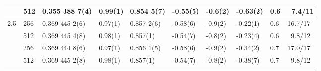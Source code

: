 \documentclass[11pt]{article}
\begin{document}
\begin{table}[htbp]
{\begin{tabular}{l|lllllllll}
        ~ & 512 & 0.355 388 7(4) & 0.99(1) & 0.854 5(7) & -0.55(5) & -0.6(2) &	-0.63(2)  & 0.6 & ~7.4/11 \\ \hline
        2.5 & 256 & 0.369 445 2(6) & 0.97(1) & 0.857 2(6) & -0.58(6) &	-0.9(2) &-0.22(1)  & 0.6 & 16.7/17  \\ 
        ~ & 512 & 0.369 445 4(8) & 0.98(1) &	0.857(1) &	-0.54(7) & -0.8(2) & -0.23(4)  & 0.6 & ~9.8/12  \\ 
        ~ & 256 & 0.369 444 8(6) & 0.97(1) &	0.856 1(5) &	-0.58(6) &	-0.9(2) & -0.34(2)  & 0.7 & 17.0/17  \\ 
        ~ & 512 & 0.369 445 2(8) & 0.98(1) &	0.857(1) &	-0.54(7) &	-0.8(2)	& -0.38(7)  & 0.7 & ~9.8/12  \\ 
        \hline\hline
    \end{tabular}
}
\end{table}
\end{document}
